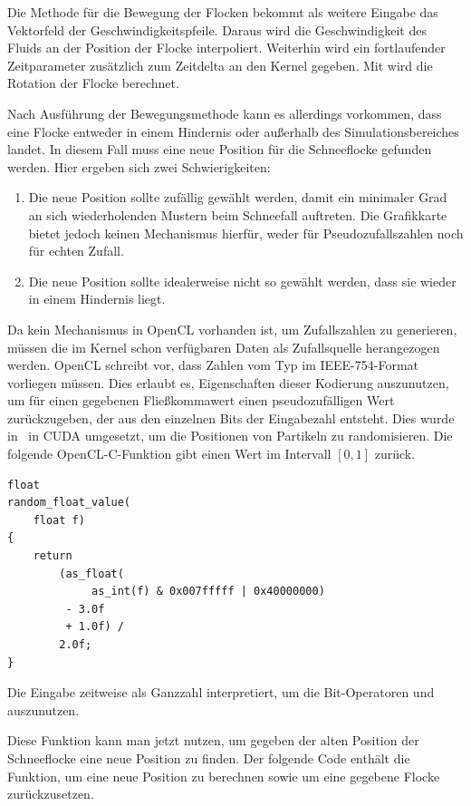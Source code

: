 Die Methode für die Bewegung der Flocken bekommt als weitere Eingabe
das Vektorfeld der Geschwindigkeitspfeile. Daraus wird die
Geschwindigkeit des Fluids an der Position der Flocke
interpoliert. Weiterhin wird ein fortlaufender Zeitparameter
 zusätzlich zum Zeitdelta 
an den Kernel gegeben. Mit  wird die Rotation der
Flocke berechnet.

Nach Ausführung der Bewegungsmethode kann es allerdings vorkommen,
dass eine Flocke entweder in einem Hindernis oder außerhalb des
Simulationsbereiches landet. In diesem Fall muss eine neue Position
für die Schneeflocke gefunden werden. Hier ergeben sich zwei
Schwierigkeiten:

\begin{enumerate}
\item Die neue Position sollte zufällig gewählt werden, damit ein
minimaler Grad an sich wiederholenden Mustern beim Schneefall
auftreten. Die Grafikkarte bietet jedoch keinen Mechanismus hierfür,
weder für Pseudozufallszahlen noch für echten Zufall.
\item Die neue Position sollte idealerweise nicht so gewählt werden,
dass sie wieder in einem Hindernis liegt.
\end{enumerate}

Da kein Mechanismus in OpenCL vorhanden ist, um Zufallszahlen zu
generieren, müssen die im Kernel schon verfügbaren Daten als
Zufallsquelle herangezogen werden. OpenCL schreibt vor, dass Zahlen
vom Typ  im IEEE-754-Format vorliegen
müssen. Dies erlaubt es, Eigenschaften dieser Kodierung auszunutzen,
um für einen gegebenen Fließkommawert einen pseudozufälligen Wert
zurückzugeben, der aus den einzelnen Bits der Eingabezahl
entsteht. Dies wurde in~\cite{Eidissen2009} in CUDA umgesetzt, um die
Positionen von Partikeln zu randomisieren. Die folgende
OpenCL-C-Funktion gibt einen Wert im Intervall $[0,1]$ zurück.

\begin{verbatim}
float
random_float_value(
    float f)
{
    return
        (as_float(
             as_int(f) & 0x007fffff | 0x40000000)
         - 3.0f
         + 1.0f) /
        2.0f;
}
\end{verbatim}

Die Eingabe  zeitweise als Ganzzahl interpretiert, um
die Bit-Operatoren \PimiddyInlineCode{\&} und \PimiddyInlineCode{|}
auszunutzen.

Diese Funktion kann man jetzt nutzen, um gegeben der alten Position
der Schneeflocke eine neue Position zu finden. Der folgende Code
enthält die Funktion, um eine neue Position zu berechnen sowie um eine
gegebene Flocke zurückzusetzen.

